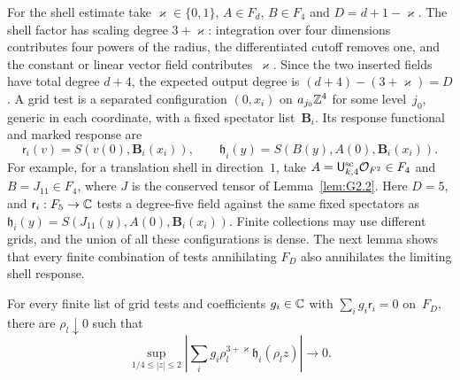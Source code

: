 For the shell estimate take $\varkappa\in\{0,1\}$, $A\in F_d$, $B\in F_4$ and $D=d+1-\varkappa$. The shell factor has scaling degree $3+\varkappa$: integration over four dimensions contributes four powers of the radius, the differentiated cutoff removes one, and the constant or linear vector field contributes~$\varkappa$. Since the two inserted fields have total degree $d+4$, the expected output degree is $(d+4)-(3+\varkappa)=D$. A grid test is a separated configuration $(0,x_i)$ on $a_{j_0}\mathbb{Z}^4$ for some level~$j_0$, generic in each coordinate, with a fixed spectator list~$\boldsymbol B_i$. Its response functional and marked response are
\begin{equation*}
\mathsf r_i(v)=S(v(0),\boldsymbol B_i(x_i)),\qquad
\mathfrak h_i(y)=S(B(y),A(0),\boldsymbol B_i(x_i)).
\end{equation*}
For example, for a translation shell in direction~$1$, take $A=\mathsf{U}_{k,4}^{\mathrm{sc}}\mathcal{O}_{F^2}\in F_4$ and $B=J_{11}\in F_4$, where $J$ is the conserved tensor of Lemma~\ref{lem:G2.2}. Here $D=5$, and $\mathsf r_i:F_5\to\mathbb{C}$ tests a degree-five field against the same fixed spectators as $\mathfrak h_i(y)=S(J_{11}(y),A(0),\boldsymbol B_i(x_i))$. Finite collections may use different grids, and the union of all these configurations is dense. The next lemma shows that every finite combination of tests annihilating $F_D$ also annihilates the limiting shell response.
\begin{lemma}\label{lem:G-annular}
For every finite list of grid tests and coefficients $g_i\in\mathbb{C}$ with $\sum_i g_i\mathsf r_i=0$ on~$F_D$, there are $\rho_l\downarrow0$ such that
\begin{equation}\label{eq:G-annular-input}
\sup_{1/4\le|z|\le2}\left|\sum_i g_i\rho_l^{3+\varkappa}\mathfrak h_i(\rho_lz)\right|\longrightarrow0.
\end{equation}
\end{lemma}
